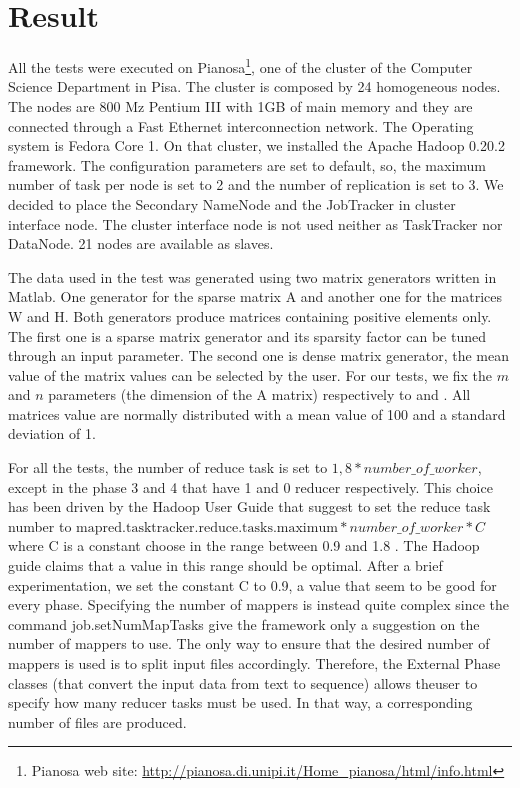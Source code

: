 \section{Result}
\label{result}

 All the tests were executed on Pianosa\footnote{Pianosa web site: \url{http://pianosa.di.unipi.it/Home_pianosa/html/info.html}}, one of the cluster of the Computer Science Department in Pisa. The cluster is composed by 24 homogeneous nodes. The nodes are 800 Mz Pentium III with 1GB of main memory and they are connected through a Fast Ethernet interconnection network. The Operating system is Fedora Core 1. On that cluster, we installed the Apache Hadoop 0.20.2 framework. The configuration parameters are set to default, so, the maximum number of task per node is set to 2 and the number of replication is set to 3. 
We decided to place the Secondary NameNode and the JobTracker in cluster interface node.
The cluster interface node is not used neither as TaskTracker nor DataNode.
21 nodes are available as slaves.

The data used in the test was generated using two matrix generators written in Matlab.
One generator for the sparse matrix A and another one for the matrices W and H. 
Both generators produce matrices containing positive elements only.
The first one is a sparse matrix generator and its sparsity factor can be tuned through an input parameter. 
The second one is dense matrix generator, the mean value of the matrix values can be selected by the user. 
For our tests, we fix the $m$ and $n$ parameters (the dimension of the A matrix) respectively to  and .
All matrices value are normally distributed with a mean value of 100 and a standard deviation of 1.

For all the tests, the number of reduce task is set to $ 1,8 * number\_of\_worker$, except in the phase 3 and 4 that have 1 and 0 reducer respectively.
This choice has been driven by the Hadoop User Guide that suggest to set the reduce task number to 
$ \text{mapred.tasktracker.reduce.tasks.maximum} * number\_of\_worker * C $where C is a constant choose in the range between 0.9 and 1.8 \cite{numeroReducer}. 
The Hadoop guide claims that a value in this range should be optimal.
After a brief experimentation, we set the constant C to 0.9, a value that seem to be good for every phase.
Specifying the number of mappers is instead quite complex since the command job.setNumMapTasks give the framework only a suggestion on the number of mappers to use.
The only way to ensure that the desired number of mappers is used is to split input files accordingly. 
Therefore, the External Phase classes (that convert the input data from text to sequence) allows theuser to specify how many reducer tasks must be used. 
In that way, a corresponding number of files are produced.

